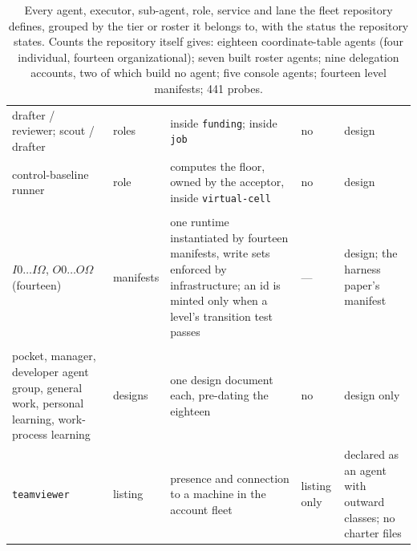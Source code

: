 \documentclass[11pt]{article}
\theoremstyle{definition}
\newcommand{\Om}{\ensuremath{\Omega}}
\begin{document}
\begin{table}[!htbp]
\begin{tabularx}{\textwidth}{@{}>{\raggedright\arraybackslash}p{3.6cm}>{\raggedright\arraybackslash}p{1.7cm}Y>{\raggedright\arraybackslash}p{1.2cm}>{\raggedright\arraybackslash}p{2.9cm}@{}}
drafter / reviewer; scout / drafter & roles & inside \texttt{funding}; inside \texttt{job} & no & design \\
control-baseline runner & role & computes the floor, owned by the acceptor, inside \texttt{virtual-cell} & no & design \\
\midrule
{} \\
$I0 \ldots I\Om$, $O0 \ldots O\Om$ (fourteen) & manifests & one runtime instantiated by fourteen manifests, write sets enforced by infrastructure; an id is minted only when a level's transition test passes & --- & design; the harness paper's manifest \\
\midrule
{} \\
pocket, manager, developer agent group, general work, personal learning, work-process learning & designs & one design document each, pre-dating the eighteen & no & design only \\
\texttt{teamviewer} & listing & presence and connection to a machine in the account fleet & listing only & declared as an agent with outward classes; no charter files \\
\bottomrule
\end{tabularx}
\caption{Every agent, executor, sub-agent, role, service and lane the fleet repository defines, grouped by the tier or roster it belongs to, with the status the repository states. Counts the repository itself gives: eighteen coordinate-table agents (four individual, fourteen organizational); seven built roster agents; nine delegation accounts, two of which build no agent; five console agents; fourteen level manifests; 441 probes.}
\label{tab:everyagent}
\end{table}
\end{document}
